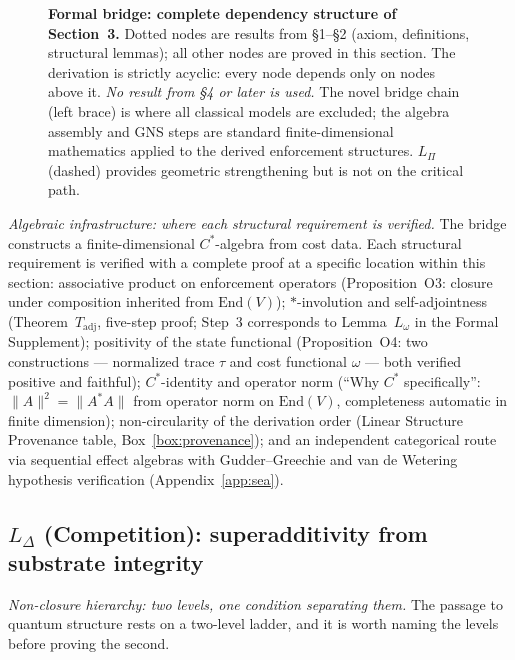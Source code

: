 \documentclass[11pt]{article}
\theoremstyle{remark}
\begin{document}
\begin{figure}[ht]
\begin{tikzpicture}
\end{tikzpicture}
\caption[Formal bridge DAG]{%
\textbf{Formal bridge: complete dependency structure of Section~3.}
Dotted nodes are results from \S1--\S2 (axiom, definitions, structural lemmas);
all other nodes are proved in this section.
The derivation is strictly acyclic: every node depends only on nodes above it.
\emph{No result from \S4 or later is used.}
The novel bridge chain (left brace) is where all classical models are excluded;
the algebra assembly and GNS steps are standard finite-dimensional mathematics
applied to the derived enforcement structures.
$L_\Pi$ (dashed) provides geometric strengthening but is not on the critical path.
}
\label{fig:formal_bridge_dag}
\end{figure}


\smallskip\noindent\textit{Algebraic infrastructure: where each structural requirement is verified.}  The bridge constructs a finite-dimensional $C^*$-algebra from cost data.  Each structural requirement is verified with a complete proof at a specific location within this section: associative product on enforcement operators (Proposition~O3: closure under composition inherited from $\mathrm{End}(V)$); $*$-involution and self-adjointness (Theorem~$T_{\mathrm{adj}}$, five-step proof; Step~3 corresponds to Lemma~$L_\omega$ in the Formal Supplement); positivity of the state functional (Proposition~O4: two constructions --- normalized trace $\tau$ and cost functional $\omega$ --- both verified positive and faithful); $C^*$-identity and operator norm (``Why $C^*$ specifically'': $\|A\|^2 = \|A^*A\|$ from operator norm on $\mathrm{End}(V)$, completeness automatic in finite dimension); non-circularity of the derivation order (Linear Structure Provenance table, Box~\ref{box:provenance}); and an independent categorical route via sequential effect algebras with Gudder--Greechie and van de Wetering hypothesis verification (Appendix~\ref{app:sea}).

\subsection{\texorpdfstring{$L_{\Delta}$}{L Delta} (Competition): superadditivity from substrate integrity}
\label{thm:ldelta}\label{sec:L_Delta}

\smallskip\noindent\textit{Non-closure hierarchy: two levels, one condition separating them.}  The passage to quantum structure rests on a two-level ladder, and it is worth naming the levels before proving the second.
\end{document}
